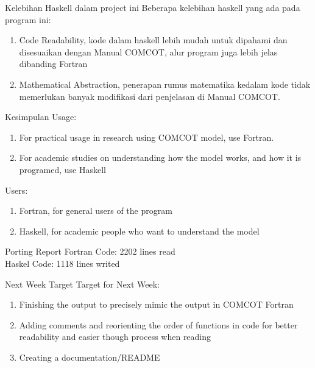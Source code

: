 \documentclass{beamer}
\begin{document}
\begin{frame}{Kelebihan Haskell dalam project ini}
    Beberapa kelebihan haskell yang ada pada program ini:
    \begin{enumerate}
        \item Code Readability, kode dalam haskell lebih mudah untuk dipahami 
        dan disesuaikan dengan Manual COMCOT, alur program juga lebih jelas dibanding
        Fortran
        \item Mathematical Abstraction, penerapan rumus matematika kedalam kode tidak
        memerlukan banyak modifikasi dari penjelasan di Manual COMCOT.
    \end{enumerate}
\end{frame}

\begin{frame}{Kesimpulan}
    Usage:
    \begin{enumerate}
        \item For practical usage in research using COMCOT model, use Fortran.
        \item For academic studies on understanding how the model works, and how it is
        programed, use Haskell
    \end{enumerate}
    Users:
    \begin{enumerate}
        \item Fortran, for general users of the program
        \item Haskell, for academic people who want to understand the model
    \end{enumerate}
\end{frame}

\begin{frame}{Porting Report}
    Fortran Code: 2202 lines read\\
    Haskel Code: 1118 lines writed
\end{frame}

\begin{frame}{Next Week Target}
    Target for Next Week:
    \begin{enumerate}
        \item Finishing the output to precisely mimic the output in COMCOT Fortran
        \item Adding comments and reorienting the order of functions in code for 
        better readability and easier though process when reading
        \item Creating a documentation/README
    \end{enumerate}
\end{frame}
\end{document}

